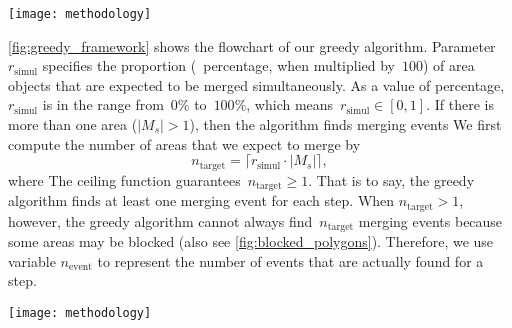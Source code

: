 \documentclass[twocolumn]{svjour3}          %
\begin{document}
\begin{figure*}[tb]
\centering
\texttt{[image: methodology]}
\caption{The Unified Modeling Language (UML) diagram of the classes 
stored in tGAP database tables.
This diagram is a slightly-improved version of 
\citet[]{Meijers2011Thesis}.
In the face table, property \emph{pip\_geometry} 
stores a point (usually the center) in the face (polygon).
The geometry of a face can be obtained 
by calling function \emph{getGeometry()}.
The face geometry is not stored 
because we want to avoid redundancy,
as the edges already stores the sequences of the points.
}
\label{fig:uml_tgap}
\end{figure*}


\fig\ref{fig:greedy_framework} shows the flowchart of our greedy algorithm.
Parameter $r_\mathrm{simul}$ specifies 
the proportion (\ie~percentage, when multiplied by~$100$) of area objects that
are expected to be merged simultaneously.
As a value of percentage, 
$r_\mathrm{simul}$ is in the range from~$0\%$ to~$100\%$,
which means~$r_\mathrm{simul} \in [0,1]$.
If there is more than one area ($|M_s|>1$),
then the algorithm finds merging events 
We first compute the number of areas that we expect to merge by
\begin{equation}
\label{eq:n_target}
n_\mathrm{target} =
\lceil r_\mathrm{simul} \cdot |M_s| \rceil,
\end{equation}
where 
The ceiling function guarantees~$n_\mathrm{target}\ge 1$.
That is to say, the greedy algorithm 
finds at least one merging event for each step.
When $n_\mathrm{target} > 1$, however,
the greedy algorithm cannot always find~$n_\mathrm{target}$ merging events
because some areas may be blocked
(also see \fig\ref{fig:blocked_polygons}).
Therefore, we use variable $n_\mathrm{event}$
to represent the number of events that are actually found for a step. 


\begin{figure*}[tb]
\centering
\texttt{[image: methodology]}
\caption{The flowchart of our greedy algorithm.
}
\label{fig:greedy_framework}
\end{figure*}
\end{document}
